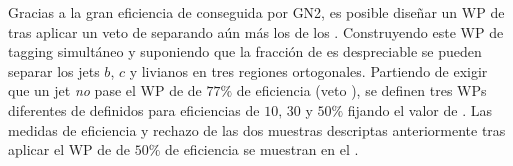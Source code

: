 Gracias a la gran eficiencia de \btagging conseguida por GN2, es posible diseñar un \ac{WP} de \ctagging tras aplicar un veto de \btagging separando aún más los \cjets de los \ljets. Construyendo este \ac{WP} de tagging simultáneo y suponiendo que la fracción de \tjets es despreciable se pueden separar los jets \(b\), \(c\) y livianos en tres regiones ortogonales. Partiendo de exigir que un jet \textit{no} pase el \ac{WP} de \btagging de \(77\%\) de eficiencia (veto \btag), se definen tres \acp{WP} diferentes de \ctagging definidos para eficiencias de \(10, \, 30\) y \(50\%\) fijando el valor de \gntc. Las medidas de eficiencia y rechazo de las dos muestras descriptas anteriormente tras aplicar el \ac{WP} de \ctag de \(50\%\) de eficiencia se muestran en el \Tab{\ref{tab:objects:ftag:ctag_efficiency_original}}.

\begin{table}[ht!]
    \caption{Medidas de eficiencia de \ctagging para \cjets, y valores de rechazos de \bjets, \ljets y \tjets en los regímenes de bajo y alto \pt. Los valores corresponden a aquellos luego de aplicar el veto del \ac{WP} de \btagging de \(77\%\) y de \(50\%\) de \ctagging}
    \label{tab:objects:ftag:ctag_efficiency_original}
\end{table}
